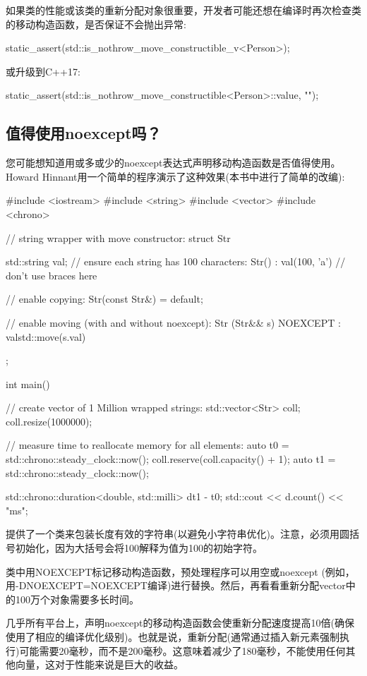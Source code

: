 如果类的性能或该类的重新分配对象很重要，开发者可能还想在编译时再次检查类的移动构造函数，是否保证不会抛出异常:

\begin{cppcode}
static_assert(std::is_nothrow_move_constructible_v<Person>);
\end{cppcode}

或升级到C++17:

\begin{cppcode}
static_assert(std::is_nothrow_move_constructible<Person>::value, "");
\end{cppcode}

\subsection{值得使用noexcept吗？}

您可能想知道用或多或少的noexcept表达式声明移动构造函数是否值得使用。Howard Hinnant用一个简单的程序演示了这种效果(本书中进行了简单的改编):

\begin{cppcode}
#include <iostream>
#include <string>
#include <vector>
#include <chrono>

// string wrapper with move constructor:
struct Str
{
	std::string val;
	// ensure each string has 100 characters:
	Str()
	: val(100, 'a') { // don’t use braces here
	}

	// enable copying:
	Str(const Str&) = default;
	
	// enable moving (with and without noexcept):
	Str (Str&& s) NOEXCEPT
	: val{std::move(s.val)} {
	}
};

int main()
{
	// create vector of 1 Million wrapped strings:
	std::vector<Str> coll;
	coll.resize(1000000);
	
	// measure time to reallocate memory for all elements:
	auto t0 = std::chrono::steady_clock::now();
	coll.reserve(coll.capacity() + 1);
	auto t1 = std::chrono::steady_clock::now();
	
	std::chrono::duration<double, std::milli> d{t1 - t0};
	std::cout << d.count() << "ms\n";
}
\end{cppcode}

提供了一个类来包装长度有效的字符串(以避免小字符串优化)。注意，必须用圆括号初始化，因为大括号会将100解释为值为100的初始字符。

类中用NOEXCEPT标记移动构造函数，预处理程序可以用空或noexcept (例如，用-DNOEXCEPT=NOEXCEPT编译)进行替换。然后，再看看重新分配vector中的100万个对象需要多长时间。

几乎所有平台上，声明noexcept的移动构造函数会使重新分配速度提高10倍(确保使用了相应的编译优化级别)。也就是说，重新分配(通常通过插入新元素强制执行)可能需要20毫秒，而不是200毫秒。这意味着减少了180毫秒，不能使用任何其他向量，这对于性能来说是巨大的收益。





